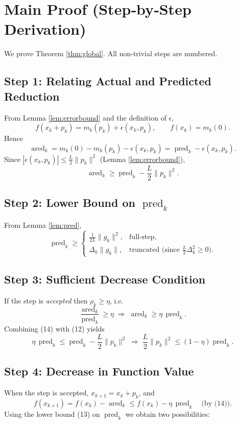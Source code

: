 \documentclass[11pt]{article}
\begin{document}
\section*{Main Proof (Step‑by‑Step Derivation)}
We prove Theorem \ref{thm:global}.  All non‑trivial steps are numbered.

\subsection*{Step 1: Relating Actual and Predicted Reduction}
From Lemma \ref{lem:errorbound} and the definition of $\epsilon$,
\[
f(x_{k}+p_{k})=m_{k}(p_{k})+\epsilon(x_{k},p_{k}),\qquad
f(x_{k})=m_{k}(0).
\]
Hence
\[
\operatorname{ared}_{k}=m_{k}(0)-m_{k}(p_{k})-\epsilon(x_{k},p_{k})
= \operatorname{pred}_{k}-\epsilon(x_{k},p_{k}).
\tag{11}
\]
Since $|\epsilon(x_{k},p_{k})|\le \frac{L}{2}\|p_{k}\|^{2}$ (Lemma \ref{lem:errorbound}),
\[
\operatorname{ared}_{k}\ge \operatorname{pred}_{k}-\frac{L}{2}\|p_{k}\|^{2}.
\tag{12}
\]

\subsection*{Step 2: Lower Bound on $\operatorname{pred}_{k}$}
From Lemma \ref{lem:pred},
\[
\operatorname{pred}_{k}\ge
\begin{cases}
\displaystyle\frac{1}{2L}\|g_{k}\|^{2}, & \text{full‑step},\\[2ex]
\displaystyle\Delta_{k}\|g_{k}\|, & \text{truncated (since }\frac{L}{2}\Delta_{k}^{2}\ge0\text{)}.
\end{cases}
\tag{13}
\]

\subsection*{Step 3: Sufficient Decrease Condition}
If the step is \emph{accepted} then $\rho_{k}\ge\eta$, i.e.
\[
\frac{\operatorname{ared}_{k}}{\operatorname{pred}_{k}}\ge\eta
\;\Longrightarrow\;
\operatorname{ared}_{k}\ge\eta\,\operatorname{pred}_{k}.
\tag{14}
\]
Combining (14) with (12) yields
\[
\eta\,\operatorname{pred}_{k}\le\operatorname{pred}_{k}-\frac{L}{2}\|p_{k}\|^{2}
\;\Longrightarrow\;
\frac{L}{2}\|p_{k}\|^{2}\le (1-\eta)\operatorname{pred}_{k}.
\tag{15}
\]

\subsection*{Step 4: Decrease in Function Value}
When the step is accepted, $x_{k+1}=x_{k}+p_{k}$, and
\[
f(x_{k+1})=f(x_{k})-\operatorname{ared}_{k}
\le f(x_{k})-\eta\,\operatorname{pred}_{k}
\quad\text{(by (14)).}
\tag{16}
\]
Using the lower bound (13) on $\operatorname{pred}_{k}$ we obtain two
possibilities:
\end{document}

